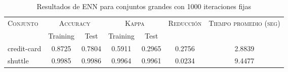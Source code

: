 \begin{table}[]
\centering
\begin{tabular}{l c c c c c c}
\hline
\multirow{2}{*}{\textsc{Conjunto}}
	& \multicolumn{2}{c}{\textsc{Accuracy}}
	& \multicolumn{2}{c}{\textsc{Kappa}}
	& \textsc{Reducción}
	& \textsc{Tiempo promedio (seg)} \\
	& Training & Test
	& Training & Test \\ 
\hline
\hline

credit-card & 0.8725 & 0.7804 & 0.5911 & 0.2965 & 0.2756 & 2.8839 \\
shuttle & 0.9985 & 0.9986 & 0.9964 & 0.9961 & 0.0234 & 9.4477 \\

\hline
\end{tabular}
\caption{Resultados de ENN para conjuntos grandes con 1000 iteraciones fijas}
\label{res-large-ENN}
\end{table}


